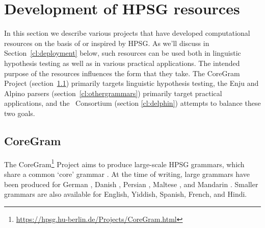 \documentclass[output=paper,nonflat]{langsci/langscibook}
\begin{document}





\section{Development of HPSG resources}
\label{cl:resources}

In this section we describe various projects that have developed computational resources on the basis of or inspired by HPSG.
As we'll discuss in Section~\ref{cl:deployment} below,
such resources can be used both in linguistic hypothesis testing as well as in various practical applications.
The intended purpose of the resources influences the form that they take.
The CoreGram Project (section~\ref{cl:coregram:1}) primarily targets linguistic hypothesis testing,
the Enju and Alpino parsers (section~\ref{cl:othergrammars}) primarily target practical applications,
and the \delphin\ Consortium (section \ref{cl:delphin}) attempts to balance these two goals.


\subsection{CoreGram}
\label{cl:coregram:1}

The CoreGram\footnote{
	\url{https://hpsg.hu-berlin.de/Projects/CoreGram.html}
} Project
aims to produce large-scale HPSG grammars,
which share a common `core' grammar \citep{MuellerCoreGram}.
At the time of writing, large grammars have been produced for
German \citep{},
Danish \citep{},
Persian \citep{},
Maltese \citep{},
and Mandarin \citep{}.
Smaller grammars are also available for English, Yiddish, Spanish, French, and Hindi.
\end{document}
